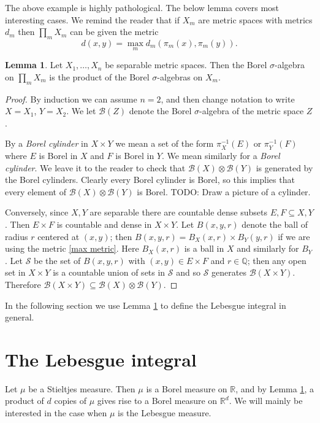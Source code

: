 \documentclass[12pt]{book}
\newcommand{\QQ}{\mathbb{Q}}
\newcommand{\RR}{\mathbb{R}}
\newcommand{\dfn}[1]{\emph{#1}\index{#1}}
\theoremstyle{definition}
\newtheorem{lemma}[theorem]{Lemma}
\begin{document}
The above example is highly pathological.
The below lemma covers most interesting cases.
We remind the reader that if $X_m$ are metric spaces with metrics $d_m$ then $\prod_m X_m$ can be given the metric
\begin{equation}
\label{max metric}
d(x, y) = \max_m d_m(\pi_m(x), \pi_m(y)).
\end{equation}

\begin{lemma}
\label{borel products}
Let $X_1, \dots, X_n$ be separable metric spaces.
Then the Borel $\sigma$-algebra on $\prod_m X_m$ is the product of the Borel $\sigma$-algebras on $X_m$.
\end{lemma}
\begin{proof}
By induction we can assume $n = 2$, and then change notation to write $X = X_1$, $Y = X_2$. We let $\mathcal B(Z)$ denote the Borel $\sigma$-algebra of the metric space $Z$.

By a \dfn{Borel cylinder} in $X \times Y$ we mean a set of the form $\pi_X^{-1}(E)$ or $\pi_Y^{-1}(F)$ where $E$ is Borel in $X$ and $F$ is Borel in $Y$.
We mean similarly for a \dfn{Borel cylinder}.
We leave it to the reader to check that $\mathcal B(X) \otimes \mathcal B(Y)$ is generated by the Borel cylinders.
Clearly every Borel cylinder is Borel, so this implies that every element of $\mathcal B(X) \otimes \mathcal B(Y)$ is Borel.
TODO: Draw a picture of a cylinder.

Conversely, since $X, Y$ are separable there are countable dense subsets $E, F \subseteq X, Y$.
Then $E \times F$ is countable and dense in $X \times Y$.
Let $B(x, y, r)$ denote the ball of radius $r$ centered at $(x, y)$; then $B(x, y, r) = B_X(x, r) \times B_Y(y, r)$ if we are using the metric \ref{max metric}. Here $B_X(x, r)$ is a ball in $X$ and similarly for $B_Y$.
Let $\mathcal S$ be the set of $B(x, y, r)$ with $(x, y) \in E \times F$ and $r \in \QQ$; then any open set in $X \times Y$ is a countable union of sets in $\mathcal S$ and so $\mathcal S$ generates $\mathcal B(X \times Y)$.
Therefore $\mathcal B(X \times Y) \subseteq \mathcal B(X) \otimes \mathcal B(Y)$.
\end{proof}

In the following section we use Lemma \ref{borel products} to define the Lebesgue integral in general.

\section{The Lebesgue integral}
Let $\mu$ be a Stieltjes measure.
Then $\mu$ is a Borel measure on $\RR$, and by Lemma \ref{borel products}, a product of $d$ copies of $\mu$ gives rise to a Borel measure on $\RR^d$.
We will mainly be interested in the case when $\mu$ is the Lebesgue measure.
\end{document}
